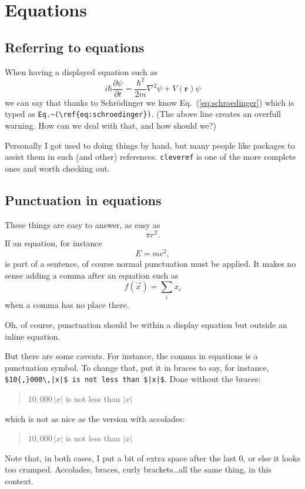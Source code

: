 \documentclass{article}
\begin{document}
\section{Equations}
\subsection{Referring to equations}\label{sec:refereq}
When having a displayed equation such as
\begin{equation}\label{eq:schroedinger}
i\hbar\frac{\partial\psi}{\partial t} = \frac{\hbar^2}{2m}\nabla^2\psi + V(\mathbf{r})\psi
\end{equation}
we can say that thanks to Schr\"odinger we know Eq.~(\ref{eq:schroedinger}) which is typed as \verb+Eq.~(\ref{eq:schroedinger})+.
(The above line creates an overfull warning.  How can we deal with that, and how should we?)

Personally I got used to doing things by hand, but many people like packages to assist them in such (and other) references.
 \verb+cleveref+  is one of the more complete ones and worth checking out.

\subsection{Punctuation in equations}

These things are easy to answer, as easy as
$$ \pi r^2.$$
If an equation, for instance
$$ E = m c^2, $$
is part of a sentence, of course normal punctuation must be applied.  It makes no sense adding a comma after an equation such as 
$$ f(\vec x) = \sum_i x_i $$
when a comma has no place there.

Oh, of course, punctuation should be within a display equation but outside an inline equation.

But there are some caveats.  For instance, the comma in equations is a punctuation symbol. To change that, put it in braces to say, for instance, \verb+$10{,}000\,|x|$ is not less than $|x|$+.  Done without the braces:
\begin{quotation}
$10,000\,|x|$ is not less than $|x|$
\end{quotation}
which is not as nice as the version with accolades:
\begin{quotation}
$10{,}000\,|x|$ is not less than $|x|$
\end{quotation}
Note that, in both cases, I put a bit of extra space after the last 0, or else it looks too cramped.  Accolades, braces, curly brackets\dots all the same thing, in this context.
\end{document}
